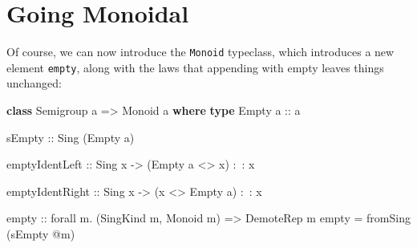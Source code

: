 \documentclass[]{article}
\newenvironment{Shaded}{}{}
\newcommand{\KeywordTok}[1]{\textcolor[rgb]{0.00,0.44,0.13}{\textbf{{#1}}}}
\newcommand{\DataTypeTok}[1]{\textcolor[rgb]{0.56,0.13,0.00}{{#1}}}
\newcommand{\OtherTok}[1]{\textcolor[rgb]{0.00,0.44,0.13}{{#1}}}
\newcommand{\FunctionTok}[1]{\textcolor[rgb]{0.02,0.16,0.49}{{#1}}}
\newcommand{\NormalTok}[1]{{#1}}
\begin{document}
\begin{Shaded}
\end{Shaded}

\section{Going Monoidal}\label{going-monoidal}

Of course, we can now introduce the \texttt{Monoid} typeclass, which introduces
a new element \texttt{empty}, along with the laws that appending with empty
leaves things unchanged:

\begin{Shaded}
\begin{Highlighting}[]
\KeywordTok{class} \DataTypeTok{Semigroup} \NormalTok{a }\OtherTok{=>} \DataTypeTok{Monoid} \NormalTok{a }\KeywordTok{where}
    \KeywordTok{type} \DataTypeTok{Empty}\OtherTok{ a ::} \NormalTok{a}

\OtherTok{    sEmpty ::} \DataTypeTok{Sing} \NormalTok{(}\DataTypeTok{Empty} \NormalTok{a)}

    \NormalTok{emptyIdentLeft}
\OtherTok{        ::} \DataTypeTok{Sing} \NormalTok{x}
        \OtherTok{->} \NormalTok{(}\DataTypeTok{Empty} \NormalTok{a }\FunctionTok{<>} \NormalTok{x) }\FunctionTok{:~:} \NormalTok{x}

    \NormalTok{emptyIdentRight}
\OtherTok{        ::} \DataTypeTok{Sing} \NormalTok{x}
        \OtherTok{->} \NormalTok{(x }\FunctionTok{<>} \DataTypeTok{Empty} \NormalTok{a) }\FunctionTok{:~:} \NormalTok{x}

\NormalTok{empty}
\OtherTok{    ::} \NormalTok{forall m}\FunctionTok{.} \NormalTok{(}\DataTypeTok{SingKind} \NormalTok{m, }\DataTypeTok{Monoid} \NormalTok{m)}
    \OtherTok{=>} \DataTypeTok{DemoteRep} \NormalTok{m}
\NormalTok{empty }\FunctionTok{=} \NormalTok{fromSing (sEmpty }\FunctionTok{@}\NormalTok{m)}
\end{Highlighting}
\end{Shaded}
\end{document}
